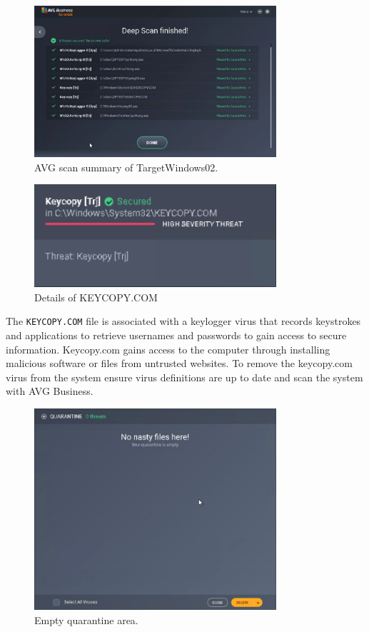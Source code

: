 \documentclass[a4paper]{article}
\begin{document}
	\begin{figure}[ht!]
		\centering
		\includegraphics[width=0.8\textwidth]{2_2_8}
		\caption{AVG scan summary of TargetWindows02.}
		\label{fig:2_2_8}
	\end{figure}

	\begin{figure}[ht!]
		\centering
		\includegraphics[width=0.8\textwidth]{2_3_2}
		\caption{Details of KEYCOPY.COM}
		\label{fig:2_3_2}
	\end{figure}

	The \texttt{KEYCOPY.COM} file is associated with a keylogger virus that records keystrokes and
	applications to retrieve usernames and passwords to gain access to secure information.
	Keycopy.com gains access to the computer through installing malicious software or files from
	untrusted websites. To remove the keycopy.com virus from the system ensure virus definitions
	are up to date and scan the system with AVG Business.
	
	\begin{figure}[ht!]
		\centering
		\includegraphics[width=0.8\textwidth]{2_3_9}
		\caption{Empty quarantine area.}
		\label{fig:2_3_9}
	\end{figure}
\end{document}
